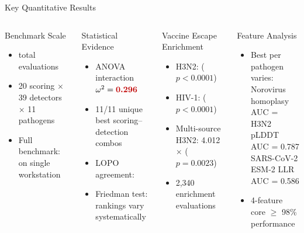 \begin{frame}{Key Quantitative Results}
  \begin{columns}[T]
    \begin{block}{Benchmark Scale}
      \begin{itemize}
        \item {} total evaluations
        \item 20 scoring $\times$ 39 detectors $\times$ 11 pathogens
        \item Full benchmark:  on single workstation
      \end{itemize}
    \end{block}

    \vspace{0.5em}
    \begin{block}{Statistical Evidence}
      \begin{itemize}
        \item ANOVA interaction $\omega^2 = \highlight{0.296}$
        \item 11/11 unique best scoring--detection combos
        \item LOPO agreement: 
        \item Friedman test: rankings vary systematically
      \end{itemize}
    \end{block}

    \begin{block}{Vaccine Escape Enrichment}
      \begin{itemize}
        \item H3N2:  ($p < 0.0001$)
        \item HIV-1:  ($p < 0.0001$)
        \item Multi-source H3N2: 4.012$\times$ ($p = 0.0023$)
        \item 2,340 enrichment evaluations
      \end{itemize}
    \end{block}

    \vspace{0.5em}
    \begin{block}{Feature Analysis}
      \begin{itemize}
        \item Best per pathogen varies: \\
              Norovirus homoplasy AUC =  \\
              H3N2 pLDDT AUC = 0.787 \\
              SARS-CoV-2 ESM-2 LLR AUC = 0.586
        \item 4-feature core $\geq$ 98\% performance
      \end{itemize}
    \end{block}
  \end{columns}
\end{frame}

